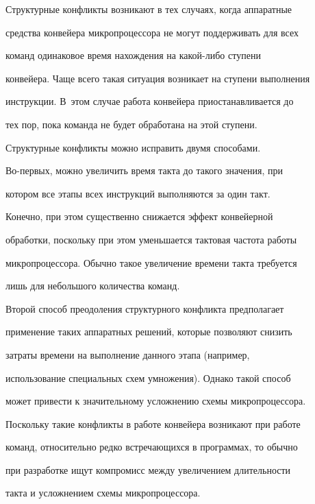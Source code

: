  Структурные конфликты возникают в тех случаях, когда  аппаратные 


средства конвейера микропроцессора не могут поддерживать для всех 


команд одинаковое время нахождения на ка\-кой-ли\-бо ступени 


конвейера. Чаще всего такая ситуация возникает на ступени выполнения 


инструкции. В~этом случае работа конвейера приостанавливается до 


тех пор, пока команда не будет обработана на этой ступени.  


{ %





}





Структурные конфликты можно исправить двумя способами. 


Во-пер\-вых, можно увеличить время такта до такого значения, при 


котором все этапы всех инструкций выполняются за один такт. 


Конечно, при этом существенно снижается  эффект конвейерной 


обработки, поскольку при этом уменьшается тактовая частота работы 


микропроцессора. Обычно такое увеличение времени такта требуется 


лишь для небольшого количества команд.  





Второй способ преодоления структурного конфликта предполагает 


применение таких аппаратных решений, которые позволяют снизить 


затраты времени на выполнение данного этапа (например, 


использование специальных схем умножения).  Однако такой способ 


может привести к значительному усложнению схемы микропроцессора.  


Поскольку такие конфликты в работе конвейера возникают при работе 


команд, относительно редко встречающихся в программах, то обычно 


при разработке ищут компромисс между увеличением длительности 


такта и усложнением схемы микропроцессора. 





